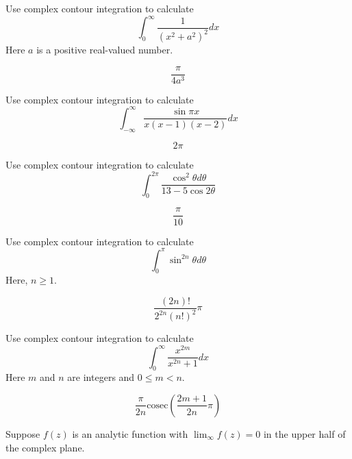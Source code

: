 \begin{exer}
Use complex contour integration to calculate
$$ \int_0^{\infty} \frac{1}{\left(x^2 + a^2\right)^2} dx$$
Here $a$ is a positive real-valued number.
\begin{sol}
$$\frac{\pi}{4 a^3}$$
\end{sol}
\end{exer}

\begin{exer}
Use complex contour integration to calculate
$$ \int_{-\infty}^{\infty} \frac{\sin \pi x}{x (x-1) (x-2)} dx$$
\begin{sol}
$$2 \pi$$
\end{sol}
\end{exer}

\begin{exer}
Use complex contour integration to calculate
$$ \int_0^{2\pi} \frac{\cos^2 \theta d \theta}{13-5\cos 2 \theta}$$
\begin{sol}
$$\frac{\pi}{10}$$
\end{sol}
\end{exer}

\begin{exer}
Use complex contour integration to calculate
$$ \int_0^\pi \sin^{2n} \theta d \theta$$
Here, $n \ge 1$.
\begin{sol}
$$\frac{(2n)!}{ 2^{2n}(n!)^2} \pi$$
\end{sol}
\end{exer}

\begin{exer}
Use complex contour integration to calculate
$$ \int_0^\infty \frac{x ^ {2m}}{x^{2n} + 1} dx$$
Here $m$ and $n$ are integers and $0 \le m < n$.
\begin{sol}
$$\frac{\pi}{2n} \mathrm{cosec} \left( \frac{2m+1}{2n} \pi \right)$$
\end{sol}
\end{exer}


\pagebreak



Suppose $f(z)$ is an analytic function with $\lim_\infty f(z) = 0$ in the upper half of the complex plane.


